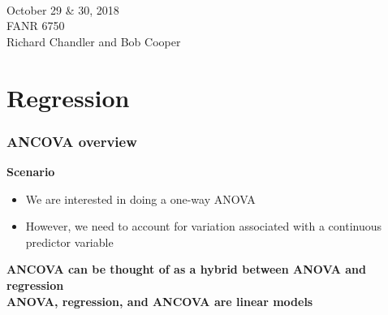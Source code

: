\documentclass[color=usenames,dvipsnames]{beamer}\usepackage[]{graphicx}\usepackage[]{color}
\begin{document}



\begin{frame}[plain]
  \huge
  \centering \par
  {\color{RoyalBlue}{Lab 11 -- ANCOVA}} \\
  \vspace{1cm}
  \LARGE
  October 29 \& 30, 2018 \\
  FANR 6750 \\
  \vfill
  \large
  Richard Chandler and Bob Cooper

\end{frame}



\section{Regression}




\begin{frame}
  \frametitle{ANCOVA overview}
  {\bf Scenario}
  \begin{itemize}
    \item We are interested in doing a one-way ANOVA
    \item However, we need to account for variation associated with a
      continuous predictor variable
  \end{itemize}
  \pause
  \vfill
  \centering \bf
  ANCOVA can be thought of as a hybrid between ANOVA and regression \\
  \pause
  \vfill
  \centering \bf
  ANOVA, regression, and ANCOVA are linear models \\
\end{frame}
\end{document}
